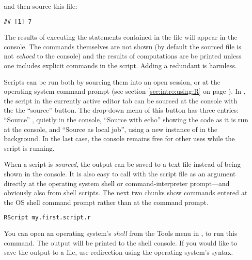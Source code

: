 \begin{playground}
and then source this file:

\begin{knitrout}
\color{fgcolor}\begin{kframe}
\begin{alltt}
\hlstd{(}\hlstd{)}
\end{alltt}
\begin{verbatim}
## [1] 7
\end{verbatim}
\end{kframe}
\end{knitrout}

The results of executing the statements contained in the file will appear in the console. The commands themselves are not shown (by default the sourced file is not \emph{echoed} to the console) and the results of computations are be printed unless one includes explicit  commands in the script. Adding a redundant  is harmless.

Scripts can be run both by sourcing them into an open \Rlang session, or at the operating system command prompt (see section \ref{sec:intro:using:R} on page \pageref{sec:intro:using:R}). In \RStudio, the script in the currently active editor tab can be sourced at the \Rlang console with the the ``source'' button.  The drop-down menu of this button has three entries: ``Source'' , quietly in the \Rlang console, ``Source with echo'' showing the code as it is run at the \Rlang console, and ``Source as local job'', using a new instance of \Rlang in the background. In the last case, the \Rlang console remains free for other uses while the script is running.

When a script is \emph{sourced}, the output can be saved to a text file instead of being shown in the console. It is also easy to call \Rpgrm with the \Rlang script file as an argument directly at the operating system shell or command-interpreter prompt---and obviously also from shell scripts. The next two chunks show commands entered at the OS shell command prompt rather than at the \Rlang command prompt.

\begin{shaded}
\footnotesize
\begin{verbatim}
RScript my.first.script.r
\end{verbatim}
\end{shaded}

You can open an operating system's \emph{shell} from the Tools menu in \RStudio, to run this command. The output will be printed to the shell console. If you would like to save the output to a file, use redirection using the operating system's syntax.


\end{playground}
